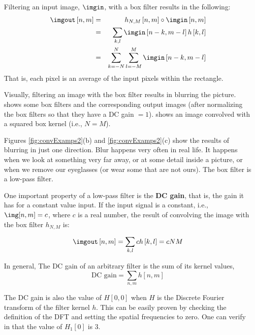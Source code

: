 Filtering an input image, $\imgin$, with a box filter results in the following:
\begin{eqnarray}
	\imgout \left[n,m\right] &=& h_{N,M} \left[n,m\right] \circ \imgin \left[n,m\right] \nonumber \\
	&=&  \sum_{k,l} \imgin \left[n-k,m-l \right] h \left[k,l \right] \nonumber \\
	&=&  \sum_{k=-N}^N \sum_{l=-M}^M \imgin \left[n-k,m-l \right]
\end{eqnarray}
That is, each pixel is an average of the input pixels within the rectangle.

Visually, filtering an image with the box filter results in blurring the picture. \Fig{\ref{fig:convExamps2}} shows some box filters and the corresponding output images (after normalizing the box filters so that they have a DC gain $= 1$).  shows an image convolved with a squared box kernel (i.e., $N=M$).

Figures \ref{fig:convExamps2}(b) and \ref{fig:convExamps2}(c)  show the results of blurring in just one direction. Blur happens very often in real life. It happens when we look at something very far away, or at some detail inside a picture, or when we remove our eyeglasses (or wear some that are not ours). The box filter is a low-pass filter.



One important property of a low-pass filter is the {\bf DC gain}, that is, the gain it has for a constant value input. If the input signal is a constant, i.e., $\img[n,m] = c$, where $c$ is a real number, the result of convolving the image with the box filter $h_{N,M}$ is:

\begin{equation}
	\imgout \left[n,m\right] = \sum_{k,l} c h \left[k,l \right] = c N M
\end{equation}

In general, The DC gain of an arbitrary filter is the sum of  its kernel values,
\begin{equation}
	\text{DC~gain} = \sum_{n,m} h[n,m]
\end{equation}

The DC gain is also the value of $H[0,0]$ when $H$ is the Discrete Fourier transform of the filter kernel $h$. This can be easily proven by checking the definition of the DFT and setting the spatial frequencies to zero. One can verify in \fig{\ref{fig:boxfilter}} that the value of $H_1[0]$ is $3$.

